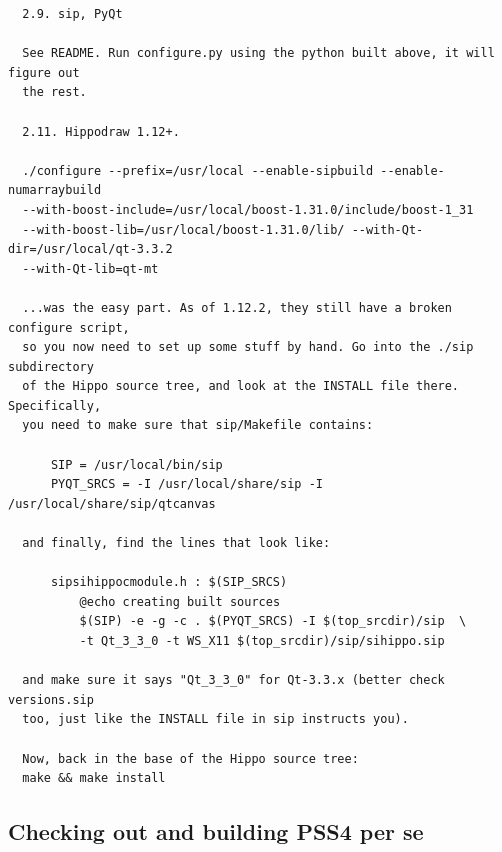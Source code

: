 \documentclass[10pt]{article}
\begin{document}
\begin{verbatim}
  2.9. sip, PyQt

  See README. Run configure.py using the python built above, it will figure out
  the rest.

  2.11. Hippodraw 1.12+.

  ./configure --prefix=/usr/local --enable-sipbuild --enable-numarraybuild
  --with-boost-include=/usr/local/boost-1.31.0/include/boost-1_31
  --with-boost-lib=/usr/local/boost-1.31.0/lib/ --with-Qt-dir=/usr/local/qt-3.3.2
  --with-Qt-lib=qt-mt
  
  ...was the easy part. As of 1.12.2, they still have a broken configure script,
  so you now need to set up some stuff by hand. Go into the ./sip subdirectory
  of the Hippo source tree, and look at the INSTALL file there. Specifically,
  you need to make sure that sip/Makefile contains:

      SIP = /usr/local/bin/sip
      PYQT_SRCS = -I /usr/local/share/sip -I /usr/local/share/sip/qtcanvas
      
  and finally, find the lines that look like:

      sipsihippocmodule.h : $(SIP_SRCS) 
	      @echo creating built sources
	      $(SIP) -e -g -c . $(PYQT_SRCS) -I $(top_srcdir)/sip  \
	      -t Qt_3_3_0 -t WS_X11 $(top_srcdir)/sip/sihippo.sip
  
  and make sure it says "Qt_3_3_0" for Qt-3.3.x (better check versions.sip
  too, just like the INSTALL file in sip instructs you).
  
  Now, back in the base of the Hippo source tree:
  make && make install
\end{verbatim}

\subsection {Checking out and building PSS4 per se}
\end{document}
